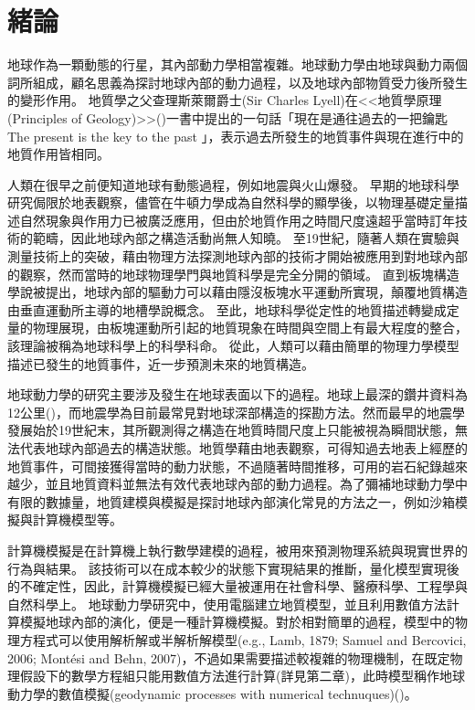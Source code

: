 
\chapter{緒論}

地球作為一顆動態的行星，其內部動力學相當複雜。地球動力學由地球與動力兩個詞所組成，顧名思義為探討地球內部的動力過程，以及地球內部物質受力後所發生的變形作用。
地質學之父查理斯萊爾爵士(Sir Charles Lyell)在<<地質學原理(Principles of Geology)>>(\citealp{lyell2009})一書中提出的一句話「現在是通往過去的一把鑰匙 The present is the key to the past 」，表示過去所發生的地質事件與現在進行中的地質作用皆相同。

人類在很早之前便知道地球有動態過程，例如地震與火山爆發。
早期的地球科學研究侷限於地表觀察，儘管在牛頓力學成為自然科學的顯學後，以物理基礎定量描述自然現象與作用力已被廣泛應用，但由於地質作用之時間尺度遠超乎當時訂年技術的範疇，因此地球內部之構造活動尚無人知曉。
至19世紀，隨著人類在實驗與測量技術上的突破，藉由物理方法探測地球內部的技術才開始被應用到對地球內部的觀察，然而當時的地球物理學門與地質科學是完全分開的領域。
直到板塊構造學說被提出，地球內部的驅動力可以藉由隱沒板塊水平運動所實現，顛覆地質構造由垂直運動所主導的地槽學說概念。
至此，地球科學從定性的地質描述轉變成定量的物理展現，由板塊運動所引起的地質現象在時間與空間上有最大程度的整合，該理論被稱為地球科學上的科學科命。
從此，人類可以藉由簡單的物理力學模型描述已發生的地質事件，近一步預測未來的地質構造。

地球動力學的研究主要涉及發生在地球表面以下的過程。地球上最深的鑽井資料為12公里(\citealp{ganchin1998seismic})，而地震學為目前最常見對地球深部構造的探勘方法。然而最早的地震學發展始於19世紀末，其所觀測得之構造在地質時間尺度上只能被視為瞬間狀態，無法代表地球內部過去的構造狀態。地質學藉由地表觀察，可得知過去地表上經歷的地質事件，可間接獲得當時的動力狀態，不過隨著時間推移，可用的岩石紀錄越來越少，並且地質資料並無法有效代表地球內部的動力過程。為了彌補地球動力學中有限的數據量，地質建模與模擬是探討地球內部演化常見的方法之一，例如沙箱模擬與計算機模型等。

計算機模擬是在計算機上執行數學建模的過程，被用來預測物理系統與現實世界的行為與結果。
該技術可以在成本較少的狀態下實現結果的推斷，量化模型實現後的不確定性，因此，計算機模擬已經大量被運用在社會科學、醫療科學、工程學與自然科學上。
地球動力學研究中，使用電腦建立地質模型，並且利用數值方法計算模擬地球內部的演化，便是一種計算機模擬。對於相對簡單的過程，模型中的物理方程式可以使用解析解或半解析解模型(e.g., Lamb, 1879; Samuel and Bercovici, 2006; Montési and Behn, 2007)，不過如果需要描述較複雜的物理機制，在既定物理假設下的數學方程組只能用數值方法進行計算(詳見第二章)，此時模型稱作地球動力學的數值模擬(geodynamic processes with numerical technuques)(\citealp{101Geodynamics})。

